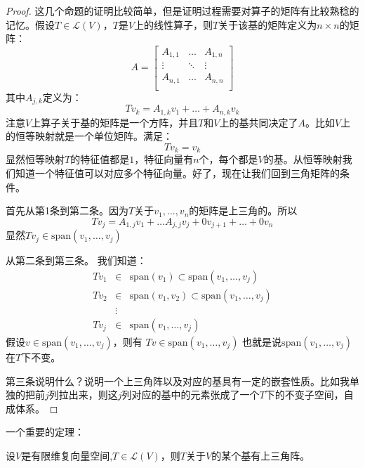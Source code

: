 \documentclass[10pt,a4paper,UTF8]{article}
\begin{document}
\begin{proof}
这几个命题的证明比较简单，但是证明过程需要对算子的矩阵有比较熟稔的记忆。假设\(T\in \mathcal{L}(V)\)，\(T\)是\(V\)上的线性算子，则\(T\)关于该基的矩阵定义为\(n\times n\)的矩阵：
\begin{equation}
\label{eq:9}
A=
\begin{bmatrix}
A_{1,1}& \ldots & A_{1,n} \\
\vdots & \ddots & \vdots \\
A_{n,1}& \ldots & A_{n,n} \\
\end{bmatrix}
\end{equation}
其中\(A_{j,k}\)定义为：
\begin{equation}
\label{eq:10}
Tv_{k} = A_{1,k}v_{1} + \ldots + A_{n,k}v_{k}
\end{equation}
注意\(V\)上算子关于基的矩阵是一个方阵，并且\(T\)和\(V\)上的基共同决定了\(A\)。比如\(V\)上的恒等映射就是一个单位矩阵。满足：\[Tv_{k} = v_{k}\] 显然恒等映射\(T\)的特征值都是\(1\)，特征向量有\(n\)个，每个都是\(V\)的基。从恒等映射我们知道一个特征值可以对应多个特征向量。好了，现在让我们回到三角矩阵的条件。

首先从第1条到第二条。因为\(T\)关于\(v_{1},\ldots ,v_{n}\)的矩阵是上三角的。所以
\begin{equation}
\label{eq:11}
Tv_{j} = A_{1,j}v_{1} + \ldots A_{j,j}v_{j} + 0 v_{j+1} + \ldots + 0 v_{n}
\end{equation}
显然\(Tv_{j}\in \mathrm{span}(v_{1},\ldots ,v_{j})\)

从第二条到第三条。
我们知道：
\begin{eqnarray}
\label{eq:12}
Tv_{1}&\in & \mathrm{span}(v_{1}) \subset \mathrm{span}(v_{1},\ldots ,v_{j}) \\
Tv_{2}&\in & \mathrm{span}(v_{1},v_{2}) \subset \mathrm{span}(v_{1},\ldots ,v_{j}) \\
&\vdots& \\
Tv_{j} &\in & \mathrm{span}(v_{1},\ldots ,v_{j})
\end{eqnarray}
假设\(v\in \mathrm{span}(v_{1},\ldots ,v_{j})\)，则有 \(Tv\in \mathrm{span}(v_{1},\ldots ,v_{j})\) 也就是说\(\mathrm{span}(v_{1},\ldots ,v_{j})\)在\(T\)下不变。

第三条说明什么？说明一个上三角阵以及对应的基具有一定的嵌套性质。比如我单独的把前\(j\)列拉出来，则这\(j\)列对应的基中的元素张成了一个\(T\)下的不变子空间，自成体系。
\end{proof}

一个重要的定理：
\begin{theorem}
设\(V\)是有限维复向量空间,\(T\in \mathcal{L}(V)\)，则\(T\)关于\(V\)的某个基有上三角阵。
\end{theorem}
\end{document}
